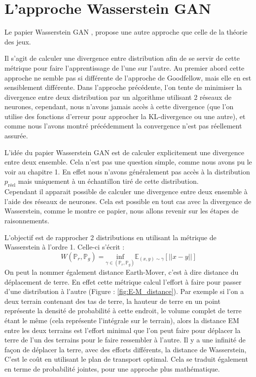 \section{L'approche Wasserstein GAN}

Le papier Wasserstein GAN \cite{arjovsky_wasserstein_2017}, propose une autre approche que celle de la théorie des jeux.

Il s'agit de calculer une divergence entre distribution afin de se servir de cette métrique pour faire l'apprentissage de l'une sur l'autre. Au premier abord cette approche ne semble pas si différente de l'approche de Goodfellow, mais elle en est sensiblement différente. Dans l'approche précédente, l'on tente de minimiser la divergence entre deux distribution par un algorithme utilisant 2 réseaux de neurones, cependant, nous n'avons jamais accès à cette divergence (que l'on utilise des fonctions d'erreur pour approcher la KL-divergence ou une autre), et comme nous l'avons montré précédemment la convergence n'est pas réellement assurée. 

L'idée du papier Wasserstein GAN est de calculer explicitement une divergence entre deux ensemble. Cela n'est pas une question simple, comme nous avons pu le voir au chapitre 1. En effet nous n'avons généralement pas accès à la distribution $p_{\text{réel}}$ mais uniquement à un échantillon tiré de cette distribution. \\ Cependant il apparait possible de calculer une divergence entre deux ensemble à l'aide des réseaux de neurones. Cela est possible en tout cas avec la divergence de Wasserstein, comme le montre ce papier, nous allons revenir sur les étapes de raisonnements.

L'objectif est de rapprocher 2 distributions en utilisant la métrique de Wasserstein à l'ordre 1. Celle-ci s'écrit :
\[
W(\mathbb{P}_r, \mathbb{P}_g)= \underset{\gamma \in (\mathbb{P}_r, \mathbb{P}_g)}{\text{inf}} \mathbb{E}_{(x,y)\sim\gamma} \left[ ||x-y||\right]
\]
On peut la nommer également distance Earth-Mover, c'est à dire distance du déplacement de terre. En effet cette métrique calcul l'effort à faire pour passer d'une distribution à l'autre (Figure : \ref{fig:E-M_distance}). Par exemple si l'on a deux terrain contenant des tas de terre, la hauteur de terre en un point représente la densité de probabilité à cette endroit, le volume complet de terre étant le même (cela représente l'intégrale sur le terrain), alors la distance EM entre les deux terrains est l'effort minimal que l'on peut faire pour déplacer la terre de l'un des terrains pour le faire ressembler à l'autre. Il y a une infinité de façon de déplacer la terre, avec des efforts différents, la distance de Wasserstein, C'est le coût en utilisant le plan de transport optimal. Cela se traduit également en terme de probabilité jointes, pour une approche plus mathématique. 

